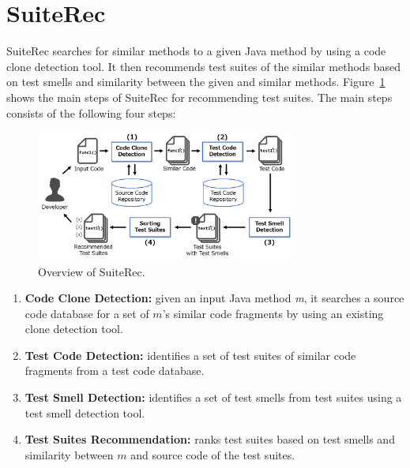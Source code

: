 \documentclass[conference]{IEEEtran}
\begin{document}
\section{SuiteRec}
\label{sec:suiterec}
\textsf{SuiteRec} searches for similar methods to a given Java method by using a code clone detection tool. It then recommends test suites of the similar methods based on test smells and similarity between the given and similar methods. Figure~\ref{fig1} shows the main steps of \textsf{SuiteRec} for recommending test suites. The main steps consists of the following four steps:


\begin{figure}[htbp]
\centerline{\includegraphics[width=8.5cm]{SuiteRec-outline.pdf}}
\caption{Overview of \textsf{SuiteRec}.}
\label{fig1}
\end{figure}



\begin{enumerate}
\renewcommand{\labelenumi}{(\arabic{enumi})}
\item \textbf{ Code Clone Detection:} given an input Java method \textit{m}, it searches a source code database for a set of $m$'s similar code fragments by using an existing clone detection tool.
\item \textbf{Test Code Detection:} identifies a set of test suites of similar code fragments from a test code database.
\item \textbf{Test Smell Detection:} identifies a set of test smells from test suites using a test smell detection tool.
\item \textbf{Test Suites Recommendation: } ranks test suites  based on test smells and similarity between $m$ and source code of the test suites.
\end{enumerate}
\end{document}
